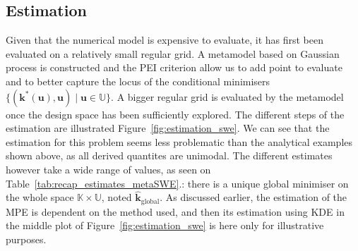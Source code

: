 \documentclass[preprint, 1p]{elsarticle}
\newcommand{\kest}{\hat{\mathbf{k}}}
\newcommand{\Kspace}{\mathbb{K}}
\newcommand{\Uspace}{\mathbb{U}}
\begin{document}
\subsection{Estimation}
Given that the numerical model is expensive to evaluate, it has first been evaluated on a relatively small regular grid. A metamodel based on Gaussian process is constructed and the PEI criterion \citep{ginsbourger_bayesian_2014,bossek_learning_2015} allow us to add point to evaluate and to better capture the locus of the conditional minimisers $\{(\mathbf{k}^*(\mathbf{u}), \mathbf{u}) \mid \mathbf{u} \in \Uspace \}$. A bigger regular grid is evaluated by the metamodel once the design space has been sufficiently explored. The different steps of the estimation are illustrated Figure~\ref{fig:estimation_swe}. We can see that the estimation for this problem seems less problematic than the analytical examples shown above, as all derived quantites are unimodal.
The different estimates however take a wide range of values, as seen on Table~\ref{tab:recap_estimates_metaSWE}.: there is a unique global minimiser on the whole space $\Kspace \times \Uspace$, noted $\kest_{\mathrm{global}}$. As discussed earlier, the estimation of the MPE is dependent on the method used, and then its estimation using KDE in the middle plot of Figure~\ref{fig:estimation_swe} is here only for illustrative purposes.
\end{document}
